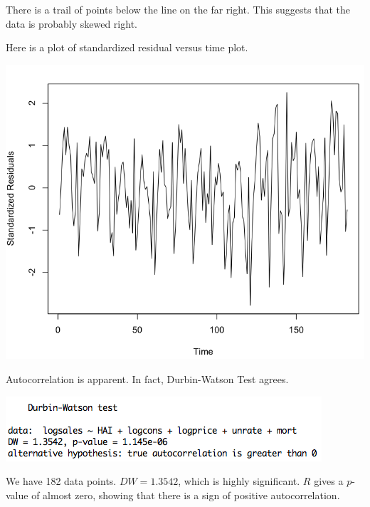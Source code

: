 \documentclass[a4 paper, 11 pt]{article}
\begin{document}
There is a trail of points below the line on the far right. This suggests that the data is probably skewed right.%

Here is a plot of standardized residual versus time plot.
\begin{center}
\includegraphics[scale=0.4]{time}
\end{center}
Autocorrelation is apparent. In fact, Durbin-Watson Test agrees.
\begin{center}
\includegraphics[scale=0.5]{DW}
\end{center}
We have 182 data points. $DW = 1.3542$, which is highly significant. $R$ gives a $p$-value of almost zero, showing that there is a sign of positive autocorrelation.
\end{document}
